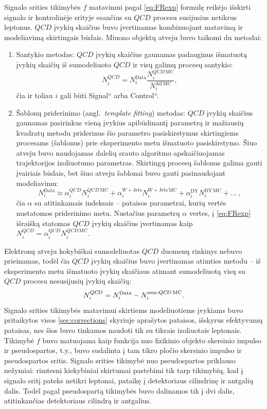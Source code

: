 \documentclass[a4paper, 12pt, oneside]{article}
\newcommand{\WJets}{W\! +\!\mathrm{Jets}}
\newcommand{\ltq}[1]{{\quotedblbase{}#1\textquotedblleft{}}}
\newcommand{\QCD}{QC\! D}
\newlength\q
\begin{document}
Signalo srities tikimybės $f$ matavimui pagal \eqref{eq:FRexp} formulę reikėjo išskirti signalo ir kontrolinėje srityje esančius
su $\QCD$ procesu susijusius netikrus leptonus.
$\QCD$ įvykių skaičius buvo įvertinamas kombinuojant matavimą ir modeliavimą skirtingais būdais.
Miuono objektų atveju buvo taikomi du metodai:
\begin{enumerate}
	\item Santykio metodas: $\QCD$ įvykių skaičius gaunamas padauginus išmatuotą įvykių skaičių iš sumodeliuoto $\QCD$ ir visų
	galimų procesų santykio:
	\begin{equation}
		N_i^{\QCD}=N_i^{\mathrm{Data}} \frac{N_i^{\QCD \, \mathrm{MC}}}{N_i^{\mathrm{All \, MC}}},
	\end{equation}
	čia ir toliau $i$ gali būti \ltq{Signal} arba \ltq{Control}.
	\item Šablonų priderinimo (angl.\ \textit{template fitting}) metodas: $\QCD$ įvykių skaičius gaunamas pasirinkus vieną
	įvykius apibūdinantį parametrą ir mažiausių kvadratų metodu priderinus šio parametro pasiskirstymus skirtingiems procesams
	(šablonus) prie eksperimento metu išmatuoto pasiskirstymo.
	Šiuo atveju buvo naudojamas dalelių srauto algoritmo apskaičiuojamas trajektorijos izoliuotumo parametras.
	Skirtingų procesų šablonus galima gauti įvairiais būdais, bet šiuo atveju šablonai buvo gauti pasinaudojant modeliavimu:
	\begin{equation}
		N_i^{\mathrm{Data}} \approx \alpha_i^{\QCD} N_i^{\QCD \, \mathrm{MC}} + \alpha_i^{\WJets} N_i^{\WJets \, \mathrm{MC}} +
		\alpha_i^{\mathrm{DY}} N_i^{\mathrm{DY \, MC}} + \dots \;,
	\end{equation}		
	čia $\alpha$ su atitinkamais indeksais -- pataisos parametrai, kurių vertės nustatomos priderinimo metu.
	Nustačius parametrų $\alpha$ vertes, į \eqref{eq:FRexp} išraišką statomas $\QCD$ įvykių skaičius įvertinamas kaip
	$N_i^{\QCD} = \alpha_i^{\QCD} N_i^{\QCD \, \mathrm{MC}}$.
\end{enumerate}

Elektronų atveju kokybiškai sumodeliuotas $\QCD$ duomenų rinkinys nebuvo prieinamas, todėl čia $\QCD$ įvykių skaičius buvo
įvertinamas atimties metodu -- iš eksperimento metu išmatuoto įvykių skaičiaus atimant sumodeliuotą visų su $\QCD$ procesu
nesusijusių įvykių skaičių:
\begin{equation}
	N_i^{\QCD} = N_i^{\mathrm{Data}} - N_i^{\mathrm{non}{\text -}\QCD \, \mathrm{MC}}.
\end{equation}
Signalo srities tikimybės matavimui skirtiems modeliuotiems įvykiams buvo pritaikytos visos \ref{sec:corrections}
skyriuje aprašytos pataisos, išskyrus efektyvumų pataisas, nes šios buvo tinkamos naudoti tik su tikrais izoliuotais leptonais.
Tikimybė $f$ buvo matuojama kaip funkcija nuo fizikinio objekto skersinio impulso ir pseudospartos,
t.y., buvo sudalinta į tam tikro pločio skersinio impulso ir pseudospartos sritis.
Signalo srities tikimybė nuo pseudospartos priklauso nežymiai: rimtesni kiekybiniai skirtumai pastebimi tik
tarp tikimybių, kad į signalo sritį pateks netikri leptonai, pataikę į detektoriaus cilindrinę ir antgalių dalis.
Todėl pagal pseudospartą tikimybės buvo dalinamos tik į dvi dalis, atitinkančias detektoriaus cilindrą ir antgalius.
\end{document}
